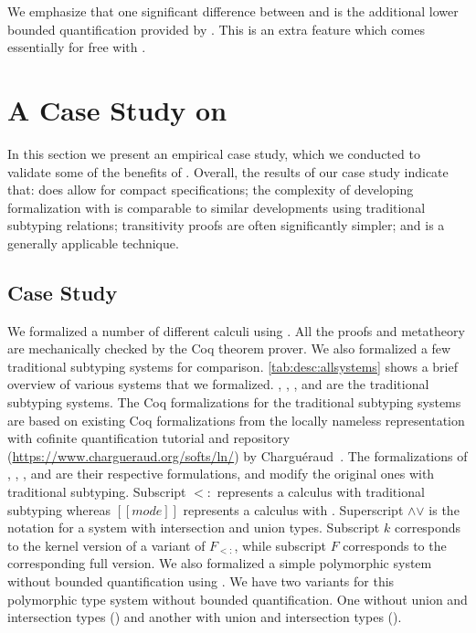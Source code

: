 \noindent We emphasize that one significant difference between
\fskiu and \gfskiu is the additional lower bounded
quantification provided by \gfskiu. This is an extra feature
which comes essentially for free with \nameduo.








\section{A Case Study on \nameduo}
\label{sec:exploration}

In this section we present an empirical case study, which we conducted
to validate some of the benefits of \nameduo. Overall, the results of our case
study indicate that: \nameduo does allow for compact specifications; the
complexity of developing formalization with \nameduo is comparable to similar
developments using traditional subtyping relations; transitivity proofs
are often significantly simpler; and \nameduo is a generally applicable technique.

\subsection{Case Study}

We formalized a number of different calculi using \nameduo.
All the proofs and metatheory are mechanically checked 
by the Coq theorem prover. We also formalized a few traditional subtyping systems for comparison.
\cref{tab:desc:allsystems} shows a brief overview of various systems that we formalized.
\stlc, \stlciu, \fsk, \fskiu and \fs are the traditional subtyping systems.
The Coq formalizations for the traditional subtyping systems are based on existing
Coq formalizations from the locally nameless representation with cofinite quantification
tutorial and repository (\url{https://www.chargueraud.org/softs/ln/}) by Chargu\'eraud~\citep{chargueraud-11-ln}.
The formalizations of \gstlc, \gstlciu, \gfsk, \gfskiu and \gf are their respective \nameduo
formulations, and modify the original ones with traditional subtyping. 
Subscript $<:$ represents a calculus with traditional subtyping whereas
$[[mode]]$ represents a calculus with \nameduo.
Superscript $\wedge$$\vee$ is the notation for a system with intersection and union types.
Subscript $k$ corresponds to the kernel version of a variant of $F_{<:}$,
while subscript $F$ corresponds to the corresponding full version.
We also formalized a simple polymorphic system without bounded quantification using \nameduo.
We have two \nameduo variants for this polymorphic type system without bounded
quantification. One without union and intersection types (\gfp)
and another with union and intersection types (\gfpiu).


